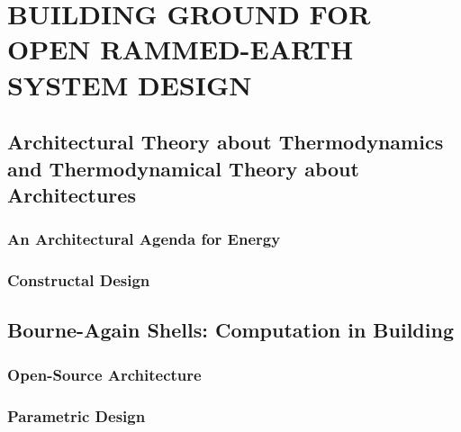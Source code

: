 \section{BUILDING GROUND FOR OPEN RAMMED-EARTH SYSTEM DESIGN}

\subsection{Architectural Theory about Thermodynamics and Thermodynamical Theory about Architectures}

\subsubsection{An Architectural Agenda for Energy}

\subsubsection{Constructal Design}


\subsection{Bourne-Again Shells: Computation in Building}

\subsubsection{Open-Source Architecture}

\subsubsection{Parametric Design}
